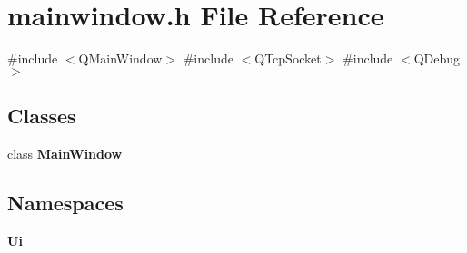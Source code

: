 \section{mainwindow.\+h File Reference}
\label{mainwindow_8h}
{\ttfamily \#include $<$Q\+Main\+Window$>$}\newline
{\ttfamily \#include $<$Q\+Tcp\+Socket$>$}\newline
{\ttfamily \#include $<$Q\+Debug$>$}\newline
\subsection*{Classes}
\begin{DoxyCompactItemize}
\item 
class \textbf{ Main\+Window}
\end{DoxyCompactItemize}
\subsection*{Namespaces}
\begin{DoxyCompactItemize}
\item 
 \textbf{ Ui}
\end{DoxyCompactItemize}
